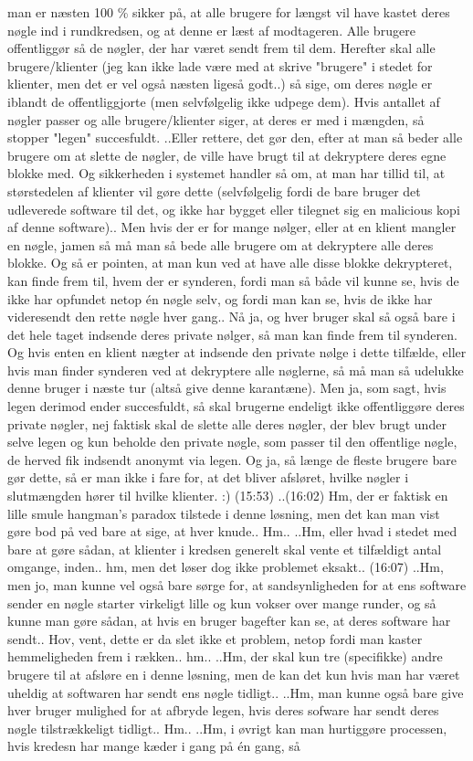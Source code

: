\documentclass{report}
\begin{document}
man er næsten 100 \% sikker på, at alle brugere for længst vil have kastet deres nøgle ind i rundkredsen, og at denne er læst af modtageren. Alle brugere offentliggør så de nøgler, der har været sendt frem til dem. Herefter skal alle brugere/klienter (jeg kan ikke lade være med at skrive "brugere" i stedet for klienter, men det er vel også næsten ligeså godt..) så sige, om deres nøgle er iblandt de offentliggjorte (men selvfølgelig ikke udpege dem). Hvis antallet af nøgler passer og alle brugere/klienter siger, at deres er med i mængden, så stopper "legen" succesfuldt. ..Eller rettere, det gør den, efter at man så beder alle brugere om at slette de nøgler, de ville have brugt til at dekryptere deres egne blokke med. Og sikkerheden i systemet handler så om, at man har tillid til, at størstedelen af klienter vil gøre dette (selvfølgelig fordi de bare bruger det udleverede software til det, og ikke har bygget eller tilegnet sig en malicious kopi af denne software).. Men hvis der er for mange nølger, eller at en klient mangler en nøgle, jamen så må man så bede alle brugere om at dekryptere alle deres blokke. Og så er pointen, at man kun ved at have alle disse blokke dekrypteret, kan finde frem til, hvem der er synderen, fordi man så både vil kunne se, hvis de ikke har opfundet netop én nøgle selv, og fordi man kan se, hvis de ikke har videresendt den rette nøgle hver gang.. Nå ja, og hver bruger skal så også bare i det hele taget indsende deres private nølger, så man kan finde frem til synderen. Og hvis enten en klient nægter at indsende den private nølge i dette tilfælde, eller hvis man finder synderen ved at dekryptere alle nøglerne, så må man så udelukke denne bruger i næste tur (altså give denne karantæne). Men ja, som sagt, hvis legen derimod ender succesfuldt, så skal brugerne endeligt ikke offentliggøre deres private nøgler, nej faktisk skal de slette alle deres nøgler, der blev brugt under selve legen og kun beholde den private nøgle, som passer til den offentlige nøgle, de herved fik indsendt anonymt via legen. Og ja, så længe de fleste brugere bare gør dette, så er man ikke i fare for, at det bliver afsløret, hvilke nøgler i slutmængden hører til hvilke klienter. :) (15:53) ..(16:02) Hm, der er faktisk en lille smule hangman's paradox tilstede i denne løsning, men det kan man vist gøre bod på ved bare at sige, at hver knude.. Hm.. ..Hm, eller hvad i stedet med bare at gøre sådan, at klienter i kredsen generelt skal vente et tilfældigt antal omgange, inden.. hm, men det løser dog ikke problemet eksakt.. (16:07) ..Hm, men jo, man kunne vel også bare sørge for, at sandsynligheden for at ens software sender en nøgle starter virkeligt lille og kun vokser over mange runder, og så kunne man gøre sådan, at hvis en bruger bagefter kan se, at deres software har sendt.. Hov, vent, dette er da slet ikke et problem, netop fordi man kaster hemmeligheden frem i rækken.. hm.. ..Hm, der skal kun tre (specifikke) andre brugere til at afsløre en i denne løsning, men de kan det kun hvis man har været uheldig at softwaren har sendt ens nøgle tidligt.. ..Hm, man kunne også bare give hver bruger mulighed for at afbryde legen, hvis deres sofware har sendt deres nøgle tilstrækkeligt tidligt.. Hm.. ..Hm, i øvrigt kan man hurtiggøre processen, hvis kredesn har mange kæder i gang på én gang, så 
\end{document}
